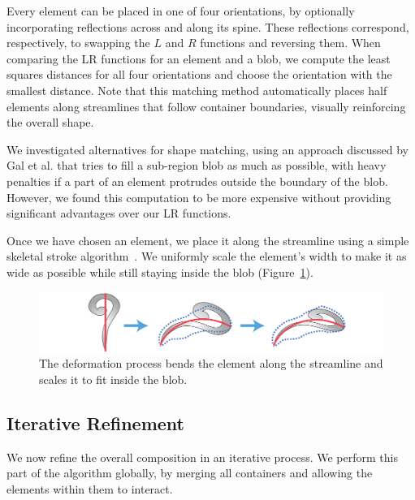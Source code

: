 Every element can be placed in one of four orientations, by optionally 
incorporating reflections across and along its spine.  These reflections
correspond, respectively, to swapping the $L$ and $R$ functions and reversing
them.  When comparing the LR functions for an element and a blob, we compute
the least squares distances for all four orientations and choose the 
orientation with the smallest distance.  Note that this matching method
automatically places half elements along streamlines that follow container
boundaries, visually reinforcing the overall shape.

We investigated alternatives for shape matching, using an approach
discussed by Gal et al. \cite{Gal2007B} that tries to fill a sub-region
blob as much as possible, with heavy penalties if a part of an
element protrudes outside the boundary of the blob. However, we found
this computation to be more expensive without providing significant
advantages over our LR functions.

Once we have chosen an element, we place it along the streamline using a
simple skeletal stroke algorithm~\cite{Hsu1993}. We uniformly scale the element's width
to make it as wide as possible while still staying inside the blob
(Figure~\ref{shape_deformation}).

\begin{figure}
\centering
\includegraphics[width=1.0\textwidth]{figures/flowpak/shape_deformation.pdf}
\caption[Shape deformation]
{\label{shape_deformation}
The deformation process bends the element along the streamline and
scales it to fit inside the blob.}
\end{figure}

\subsection{Iterative Refinement}
\label{flowpak_iterative_refinement}

We now refine the overall composition in an iterative process.  We perform
this part of the algorithm globally, by merging all containers and allowing the
elements within them to interact.

